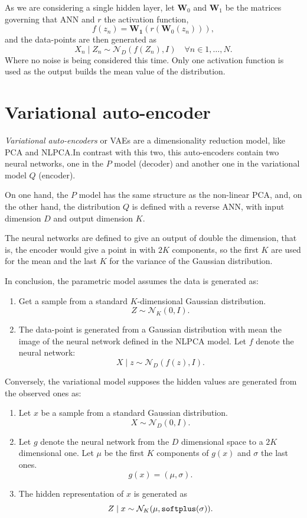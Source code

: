 As we are considering a single hidden layer, let \(\bm{W}_{0}\) and \(\bm{W}_{1}\) be the matrices governing that ANN and \(r\) the activation function,
\[
  f(z_{n}) = \bm{W_{1}}(r(\bm{W}_{0}(z_{n}))),
\]
and the data-points are then generated as
\[
  X_{n}\mid Z_{n} \sim \mathcal{N}_{D}(f(Z_{n}), I) \quad \forall n \in 1,\dots,N.
\]
Where no noise is being considered this time. Only one activation function is used as the output builds the mean value of the distribution.

\section{Variational auto-encoder}\label{sec:vae}

\emph{Variational auto-encoders} or VAEs are a dimensionality reduction model, like PCA and NLPCA.\@ In contrast with this two, this auto-encoders contain two neural networks, one in the \(P\) model (decoder) and another one in the variational model \(Q\) (encoder).

On one hand, the \(P\) model has the same structure as the non-linear PCA, and, on the other hand, the  distribution \(Q\) is defined with a reverse ANN, with input dimension \(D\) and output dimension \(K\).

The neural networks are defined to give an output of double the dimension, that is, the encoder would give a point in with \( 2K \) components, so the first \( K \) are used for the mean and the last \( K \) for the variance of the Gaussian distribution.

In conclusion, the parametric model assumes the data is generated as:
\begin{enumerate}
  \item Get a sample from a standard \(K\)-dimensional Gaussian distribution.
    \[
    Z \sim \mathcal{N}_{K}(0,I).
    \]
  \item The data-point is generated from a Gaussian distribution with mean the image of the neural network defined in the NLPCA model. Let \(f\) denote the neural network:
    \[
    X \mid z \sim \mathcal{N}_{D}(f(z), I).
    \]
\end{enumerate}
Conversely, the variational model supposes the hidden values are generated from the observed ones as:
\begin{enumerate}
  \item Let \(x\) be a sample from a standard Gaussian distribution.
    \[
    X \sim \mathcal{N}_{D}(0,I).
    \]
  \item Let \(g\) denote the neural network from the \(D\) dimensional space to a \(2K\) dimensional one. Let \(\mu\) be the first \(K\) components of \(g(x)\) and \(\sigma\) the last ones.
    \[
    g(x) = (\mu, \sigma).
    \]
  \item The hidden representation of \(x\) is generated as
    \[
    Z \mid x \sim \mathcal{N}_{K}(\mu, \text{\texttt{softplus}}(\sigma)).
    \]
\end{enumerate}

